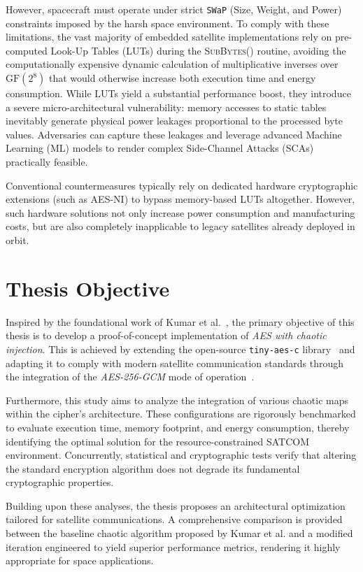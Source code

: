 \documentclass[11pt,a4paper]{report}
\begin{document}
However, spacecraft must operate under strict \texttt{SWaP} (Size, Weight, and Power) constraints imposed by the harsh space environment. 
To comply with these limitations, the vast majority of embedded satellite implementations rely on pre-computed Look-Up Tables (LUTs) during the \textsc{SubBytes()} routine, 
avoiding the computationally expensive dynamic calculation of multiplicative inverses over $\mathrm{GF}(2^{8})$ that would otherwise increase both execution time and energy consumption. 
While LUTs yield a substantial performance boost, they introduce a severe micro-architectural vulnerability: 
memory accesses to static tables inevitably generate physical power leakages proportional to the processed byte values. 
Adversaries can capture these leakages and leverage advanced Machine Learning (ML) models to render complex Side-Channel Attacks (SCAs) practically feasible.

Conventional countermeasures typically rely on dedicated hardware cryptographic extensions (such as AES-NI) to bypass memory-based LUTs altogether. 
However, such hardware solutions not only increase power consumption and manufacturing costs, but are also completely inapplicable to legacy satellites already deployed in orbit.

\section{Thesis Objective}
Inspired by the foundational work of Kumar et al.~\cite{KumarPaper}, the primary objective of this thesis is to develop a proof-of-concept implementation of \textit{AES with chaotic injection}. 
This is achieved by extending the open-source \texttt{tiny-aes-c} library~\cite{tinyAES} and adapting it to comply with modern satellite communication standards through the integration of the \textit{AES-256-GCM} mode of operation~\cite{AES256-GCM}.

Furthermore, this study aims to analyze the integration of various chaotic maps within the cipher's architecture. 
These configurations are rigorously benchmarked to evaluate execution time, memory footprint, and energy consumption, 
thereby identifying the optimal solution for the resource-constrained SATCOM environment. 
Concurrently, statistical and cryptographic tests verify that altering the standard encryption algorithm does not degrade its fundamental cryptographic properties.

Building upon these analyses, the thesis proposes an architectural optimization tailored for satellite communications. 
A comprehensive comparison is provided between the baseline chaotic algorithm proposed by Kumar et al. and a modified iteration engineered to yield superior performance metrics, 
rendering it highly appropriate for space applications.
\end{document}
